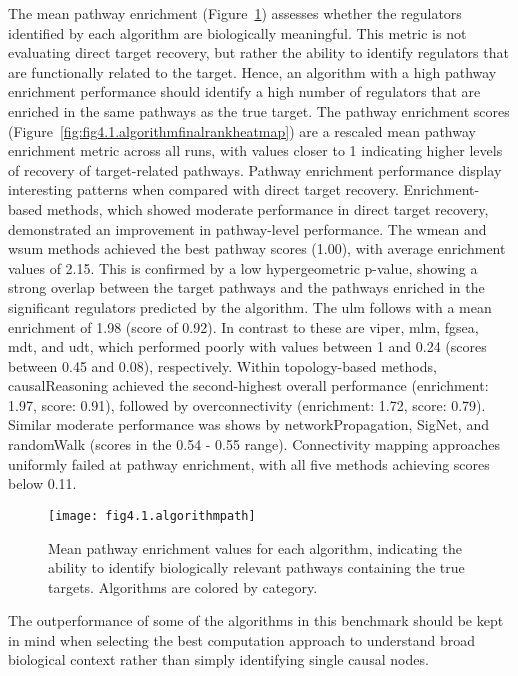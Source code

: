 The mean pathway enrichment (Figure~\ref{fig:fig4.1.algorithmpath}) assesses whether the regulators identified by each algorithm are biologically meaningful. This metric is not evaluating direct target recovery, but rather the ability to identify regulators that are functionally related to the target. Hence, an algorithm with a high pathway enrichment performance should identify a high number of regulators that are enriched in the same pathways as the true target. The pathway enrichment scores (Figure~\ref{fig:fig4.1.algorithmfinalrankheatmap}) are a rescaled mean pathway enrichment metric across all runs, with values closer to 1 indicating higher levels of recovery of target-related pathways. Pathway enrichment performance display interesting patterns when compared with direct target recovery. Enrichment-based methods, which showed moderate performance in direct target recovery, demonstrated an improvement in pathway-level performance. The wmean and wsum methods achieved the best pathway scores (1.00), with average enrichment values of 2.15. This is confirmed by a low hypergeometric p-value, showing a strong overlap between the target pathways and the pathways enriched in the significant regulators predicted by the algorithm. The ulm follows with a mean enrichment of 1.98 (score of 0.92). In contrast to these are viper, mlm, fgsea, mdt, and udt, which performed poorly with values between 1 and 0.24 (scores between 0.45 and 0.08), respectively. Within topology-based methods, causalReasoning achieved the second-highest overall performance (enrichment: 1.97, score: 0.91), followed by overconnectivity (enrichment: 1.72, score: 0.79). Similar moderate performance was shows by networkPropagation, SigNet, and randomWalk (scores in the 0.54 - 0.55 range). Connectivity mapping approaches uniformly failed at pathway enrichment, with all five methods achieving scores below 0.11.

\begin{figure}[htbp]
    \centering
    \texttt{[image: fig4.1.algorithmpath]}
    \caption[Mean pathway enrichment values for each algorithm.]{Mean pathway enrichment values for each algorithm, indicating the ability to identify biologically relevant pathways containing the true targets. Algorithms are colored by category.}
    \label{fig:fig4.1.algorithmpath}
\end{figure}


The outperformance of some of the algorithms in this benchmark should be kept in mind when selecting the best computation approach to understand broad biological context rather than simply identifying single causal nodes. 

